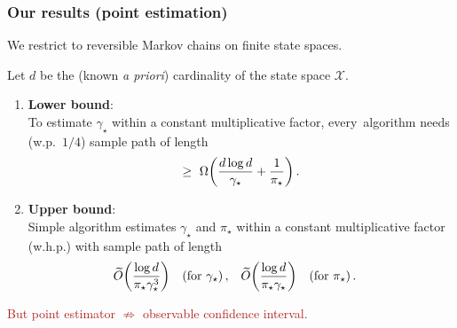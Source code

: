 \documentclass[11pt,compress,blue4,notheorems,handout]{beamer}
\newcommand{\GREEN}[1]{\textcolor{boldgreen}{#1}}
\newcommand{\FIREBRICK}[1]{\textcolor{firebrick}{#1}}
\newcommand\fns\footnotesize
\newcommand\pimin{\ensuremath{\pi_{\star}}}
\newcommand\gap{\ensuremath{\gamma_{\star}}}
\newcommand\states{\ensuremath{\mathcal{X}}}
\begin{document}

\begin{frame}
  \frametitle{Our results (point estimation)}

  We restrict to \GREEN{reversible Markov chains} on \GREEN{finite
  state spaces}.

  Let $d$ be the (known \emph{a priori}) cardinality of the state
  space $\states$.

  \begin{enumerate}
    \item<2->
      {\fns\textbf{Lower bound}:} \\
      To estimate $\gap$ within a constant multiplicative factor,
      \mbox{every algorithm} needs (w.p.~$1/4$) sample path of
      length
      \[
        \geq \
        \Omega\Parens{
          \frac{d \log d}{\gap} + \frac1{\pimin}
        }
        \,.
      \]

    \item<3->
      {\fns\textbf{Upper bound}:} \\
      Simple algorithm estimates $\gap$ and $\pimin$ within a constant
      multiplicative factor (w.h.p.) with sample path of length
      \begin{align*}
        \wt O\Parens{ \frac{\log d}{\pimin\gap^3} }
        & \quad
        \text{(for $\gap$)}
        \,,
        &
        \wt O\Parens{ \frac{\log d}{\pimin\gap} }
        & \quad
        \text{(for $\pimin$)}
        \,.
      \end{align*}

  \end{enumerate}

  \begin{center}
    \FIREBRICK{%
      But point estimator $\not\Rightarrow$ observable
      confidence interval.
    }
  \end{center}

\end{frame}

\end{document}
